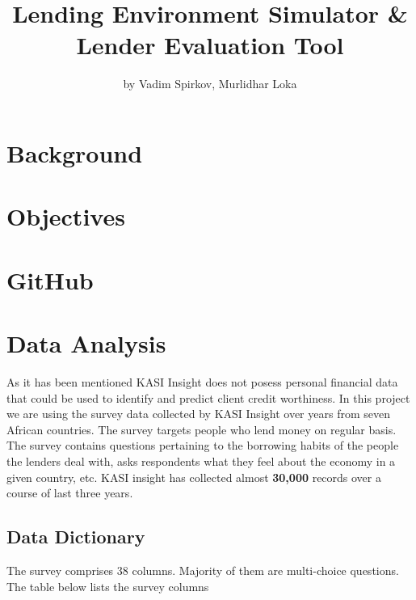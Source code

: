 \title{Lending Environment Simulator \& Lender Evaluation Tool}
\author{by Vadim Spirkov, Murlidhar Loka}

\maketitle



\hypertarget{background}{%
\section{Background}\label{background}}

\hypertarget{objectives}{%
\section{Objectives}\label{objectives}}

\hypertarget{github}{%
\section{GitHub}\label{github}}

\hypertarget{data-analysis}{%
\section{Data Analysis}\label{data-analysis}}

As it has been mentioned KASI Insight does not posess personal financial
data that could be used to identify and predict client credit
worthiness. In this project we are using the survey data collected by
KASI Insight over years from seven African countries. The survey targets
people who lend money on regular basis. The survey contains questions
pertaining to the borrowing habits of the people the lenders deal with,
asks respondents what they feel about the economy in a given country,
etc. KASI insight has collected almost \textbf{30,000} records over a
course of last three years.

\hypertarget{data-dictionary}{%
\subsection{Data Dictionary}\label{data-dictionary}}

The survey comprises 38 columns. Majority of them are multi-choice
questions. The table below lists the survey columns

